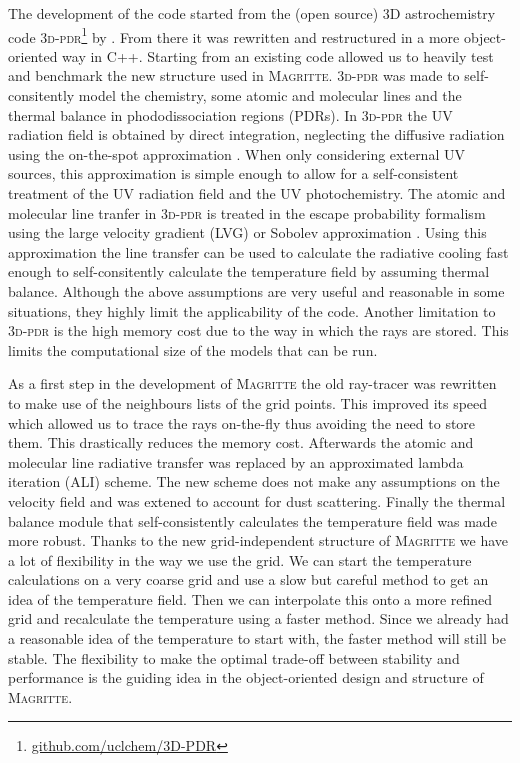 \documentclass[a4paper,fleqn,usenatbib]{mnras}
\begin{document}
The development of the code started from the (open source) 3D astrochemistry code \textsc{3d-pdr}\footnote{\href{https://github.com/uclchem/3D-PDR}{github.com/uclchem/3D-PDR}} by \citet{Bisbas2012}. From there it was rewritten and restructured in a more object-oriented way in C++. Starting from an existing code allowed us to heavily test and benchmark the new structure used in \textsc{Magritte}. \textsc{3d-pdr} was made to self-consitently model the chemistry, some atomic and molecular lines and the thermal balance in phododissociation regions (PDRs). In \textsc{3d-pdr} the UV radiation field is obtained by direct integration, neglecting the diffusive radiation using the on-the-spot approximation \citep{Osterbrock1974}. When only considering external UV sources, this approximation is simple enough to allow for a self-consistent treatment of the UV radiation field and the UV photochemistry. The atomic and molecular line tranfer in \textsc{3d-pdr} is treated in the escape probability formalism using the large velocity gradient (LVG) or Sobolev approximation \citep{Sobolev1960, Castor1970, deJong1975, Poelman2005}. Using this approximation the line transfer can be used to calculate the radiative cooling fast enough to self-consitently calculate the temperature field by assuming thermal balance. Although the above assumptions are very useful and reasonable in some situations, they highly limit the applicability of the code. Another limitation to \textsc{3d-pdr} is the high memory cost due to the way in which the rays are stored. This limits the computational size of the models that can be run.

As a first step in the development of \textsc{Magritte} the old ray-tracer was rewritten to make use of the neighbours lists of the grid points. This improved its speed which allowed us to trace the rays on-the-fly thus avoiding the need to store them. This drastically reduces the memory cost. Afterwards the atomic and molecular line radiative transfer was replaced by an approximated lambda iteration (ALI) scheme. The new scheme does not make any assumptions on the velocity field and was extened to account for dust scattering. Finally the thermal balance module that self-consistently calculates the temperature field was made more robust. Thanks to the new grid-independent structure of \textsc{Magritte} we have a lot of flexibility in the way we use the grid. We can start the temperature calculations on a very coarse grid and use a slow but careful method to get an idea of the temperature field. Then we can interpolate this onto a more refined grid and recalculate the temperature using a faster method. Since we already had a reasonable idea of the temperature to start with, the faster method will still be stable. The flexibility to make the optimal trade-off between stability and performance is the guiding idea in the object-oriented design and structure of \textsc{Magritte}.
\end{document}
